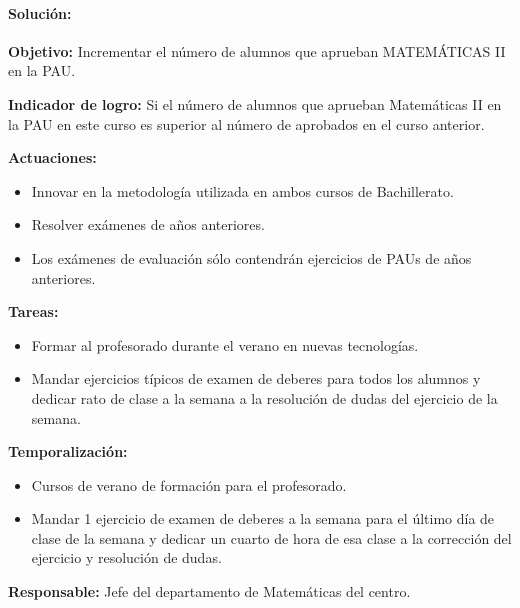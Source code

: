 {\paragraph{Solución: }

\textbf{Objetivo:}
Incrementar el número de alumnos que aprueban MATEMÁTICAS II en la PAU.


\textbf{Indicador de logro:}
Si el número de alumnos que aprueban Matemáticas II en la PAU en este curso es superior al número de aprobados en el curso anterior.


\textbf{Actuaciones:}
\vspace{-0.3cm}
\begin{itemize}
	\item Innovar en la metodología utilizada en ambos cursos de Bachillerato.

	\item Resolver exámenes de años anteriores.

	\item Los exámenes de evaluación sólo contendrán ejercicios de PAUs de años anteriores.

\end{itemize}

\textbf{Tareas:}
\vspace{-0.3cm}
\begin{itemize}
	\item Formar al profesorado durante el verano en nuevas tecnologías.

	\item Mandar ejercicios típicos de examen de deberes para todos los alumnos y dedicar rato de clase a la semana a la resolución de dudas del ejercicio de la semana.

\end{itemize}


\textbf{Temporalización:}
\vspace{-0.3cm}
\begin{itemize}
	\item Cursos de verano de formación para el profesorado.

	\item Mandar 1 ejercicio de examen de deberes a la semana para el último día de clase de la semana y dedicar un cuarto de hora de esa clase a la corrección del ejercicio y resolución de dudas.

\end{itemize}

\textbf{Responsable:}
Jefe del departamento de Matemáticas del centro.


}
